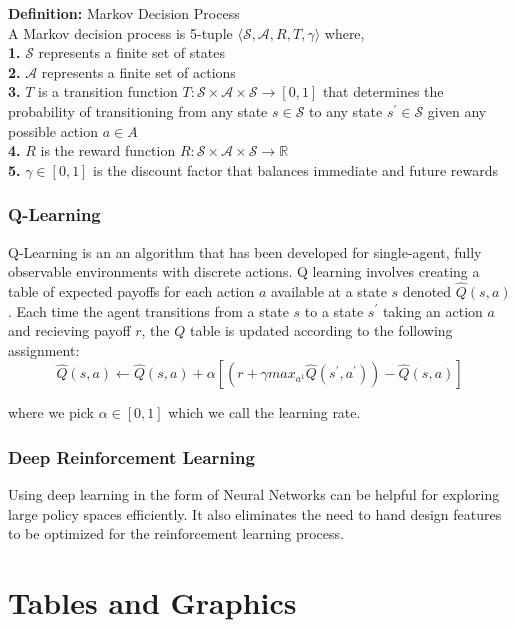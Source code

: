 \documentclass[12pt,twoside]{reedthesis}
\begin{document}
	\textbf{Definition:} Markov Decision Process \\
	A Markov decision process is 5-tuple $ \langle \mathcal{S, A,} R, T, \gamma \rangle $ where, \\
	\textbf{1.} $\mathcal{S}$ represents a finite set of states \\
	\textbf{2.} $\mathcal{A}$ represents a finite set of actions \\
	\textbf{3.} $T$ is a transition function $T: \mathcal{S} \times \mathcal{A} \times \mathcal{S} \rightarrow [0,1]$ that determines the probability of transitioning from any state $s \in \mathcal{S}$ to any state $s^{'} \in \mathcal{S}$ given any possible action $a \in A$\\
	\textbf{4.} $R$ is the reward function $R: \mathcal{S} \times \mathcal{A} \times \mathcal{S} \rightarrow \mathbb{R}$\\
	\textbf{5.} $\gamma \in [0,1]$ is the discount factor that balances immediate and future rewards
	
	
\subsection{Q-Learning}
Q-Learning is an an algorithm that has been developed for single-agent, fully observable environments with discrete actions. Q learning involves creating a table of expected payoffs for each action $a$ available at a state $s$ denoted $\hat{Q}(s,a)$. Each time the agent transitions from a state $s$ to a state $s^{'}$ taking an action $a$ and recieving payoff $r$, the $Q$ table is updated according to the following assignment:
$$ \hat{Q}(s,a) \leftarrow \hat{Q}(s,a) + \alpha [(r + \gamma max_{a^{1}} \hat{Q}(s^{'}, a^{'})) - \hat{Q}(s,a)] $$

where we pick $\alpha \in [0,1]$ which we call the learning rate.

\subsection{Deep Reinforcement Learning}
Using deep learning in the form of Neural Networks can be helpful for exploring large policy spaces efficiently. It also eliminates the need to hand design features to be optimized for the reinforcement learning process. \cite{Shoham2008} 



\chapter{Tables and Graphics}
\end{document}
